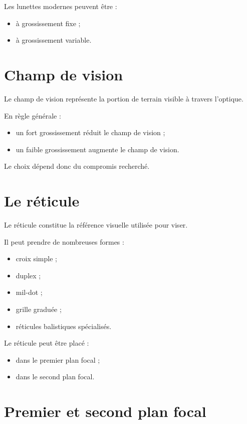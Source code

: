 Les lunettes modernes peuvent être :

\begin{itemize}
    \item à grossissement fixe ;
    \item à grossissement variable.
\end{itemize}

\section{Champ de vision}

Le champ de vision représente la portion de terrain visible à travers
l'optique.

En règle générale :

\begin{itemize}
    \item un fort grossissement réduit le champ de vision ;
    \item un faible grossissement augmente le champ de vision.
\end{itemize}

Le choix dépend donc du compromis recherché.

\section{Le réticule}

Le réticule constitue la référence visuelle utilisée pour viser.

Il peut prendre de nombreuses formes :

\begin{itemize}
    \item croix simple ;
    \item duplex ;
    \item mil-dot ;
    \item grille graduée ;
    \item réticules balistiques spécialisés.
\end{itemize}

Le réticule peut être placé :

\begin{itemize}
    \item dans le premier plan focal ;
    \item dans le second plan focal.
\end{itemize}

\section{Premier et second plan focal}

